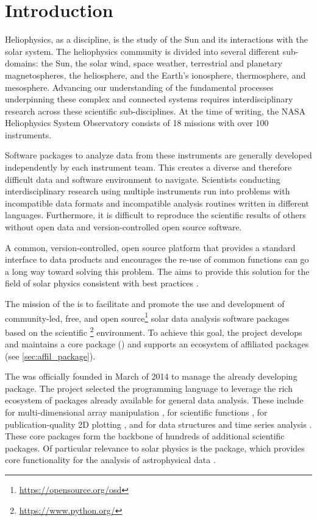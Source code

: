 \section{Introduction}
\label{sec:intro}

Heliophysics, as a discipline, is the study of the Sun and its interactions with the solar system.
The heliophysics community is divided into several different sub-domains: the Sun, the solar wind, space weather, terrestrial and planetary magnetospheres, the heliosphere, and the Earth's ionosphere, thermosphere, and mesosphere.
Advancing our understanding of the fundamental processes underpinning these complex and connected systems requires interdisciplinary research across these scientific sub-disciplines.
At the time of writing, the NASA Heliophysics System Observatory consists of 18 missions with over 100 instruments.

Software packages to analyze data from these instruments are generally developed independently by each instrument team.
This creates a diverse and therefore difficult data and software environment to navigate.
Scientists conducting interdisciplinary research using multiple instruments run into problems with incompatible data formats and incompatible analysis routines written in different languages.
Furthermore, it is difficult to reproduce the scientific results of others without open data and version-controlled open source software.

A common, version-controlled, open source platform that provides a standard interface to data products and encourages the re-use of common functions can go a long way toward solving this problem.
The \sunpyproj aims to provide this solution for the field of solar physics consistent with best practices \citep{Wilson:2014cka}.

The mission of the \sunpyproj is to facilitate and promote the use and development of community-led, free, and open source\footnote{\url{https://opensource.org/osd}} solar data analysis software packages based on the scientific \python\footnote{\url{https://www.python.org/}} environment.
To achieve this goal, the project develops and maintains a core package (\sunpypkg) and supports an ecosystem of affiliated packages (see \autoref{sec:affil_package}).

The \sunpyproj was officially founded in March of 2014 to manage the already developing \sunpypkg package.
The project selected the \python programming language to leverage the rich ecosystem of packages already available for general data analysis.
These include \numpy for multi-dimensional array manipulation \citep{numpy}, \scipy for scientific functions \citep{scipy}, \matplotlib for publication-quality 2D plotting \citep{matplotlib}, and \pandas for data structures and time series analysis \citep{pandas}.
These core packages form the backbone of hundreds of additional scientific \python packages.
Of particular relevance to solar physics is the \astropypkg package, which provides core functionality for the analysis of astrophysical data \citep{astropy2018}.

